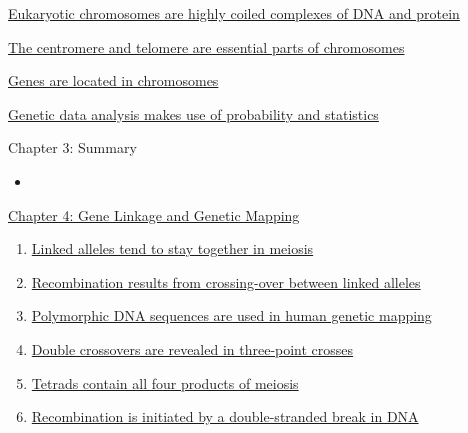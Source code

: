 \documentclass[12pt,letterpaper]{article}
\newcommand{\thetitle}{\hypertarget{home}{Essential Genetics and Genomics}}
\begin{document}
\hypertarget{3.4}{}
\begin{secbox}{\hyperlink{3}{Eukaryotic chromosomes are highly coiled complexes of DNA and protein}}{

}\end{secbox}

\hypertarget{3.5}{}
\begin{secbox}{\hyperlink{3}{The centromere and telomere are essential parts of chromosomes}}{

}\end{secbox}

\hypertarget{3.6}{}
\begin{secbox}{\hyperlink{3}{Genes are located in chromosomes}}{

}\end{secbox}

\hypertarget{3.7}{}
\begin{secbox}{\hyperlink{3}{Genetic data analysis makes use of probability and statistics}}{

}\end{secbox}

\begin{probbox}{Chapter 3: Summary}{
    \begin{itemize}
        \item
    \end{itemize}
}\end{probbox}



\clearpage

\renewcommand{\thetitle}{\hypertarget{4}{Gene Linkage and Genetic Mapping}}
\hypertarget{4}{} 

\begin{chapbox}{\hyperlink{home}{Chapter 4: Gene Linkage and Genetic Mapping}}
    \begin{enumerate}
        \item \hyperlink{4.1}{Linked alleles tend to stay together in meiosis}
        \item \hyperlink{4.2}{Recombination results from crossing-over between linked alleles}
        \item \hyperlink{4.3}{Polymorphic DNA sequences are used in human genetic mapping}
        \item \hyperlink{4.4}{Double crossovers are revealed in three-point crosses}
        \item \hyperlink{4.5}{Tetrads contain all four products of meiosis}
        \item \hyperlink{4.6}{Recombination is initiated by a double-stranded break in DNA}
    \end{enumerate}
\end{chapbox}
\end{document}
